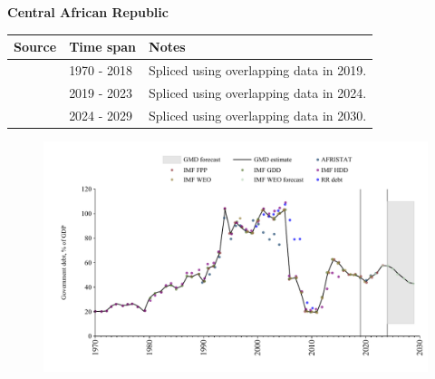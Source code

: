 \documentclass[12pt,a4paper,landscape]{article}
\begin{document}
\begin{adjustbox}{max totalsize={\paperwidth}{\paperheight},center}
\begin{minipage}[t][\textheight][t]{\textwidth}
\vspace*{0.5cm}
{}
\begin{center}
{\Large\bfseries Central African Republic}
\end{center}
\vspace{0.5cm}
\begin{table}[H]
\centering
\small
\begin{tabular}{|l|l|l|}
\hline
\textbf{Source} & \textbf{Time span} & \textbf{Notes} \\
\hline
\rowcolor{white}\cite{IMF_GDD}& 1970 - 2018 &Spliced using overlapping data in 2019.\\
\rowcolor{lightgray}\cite{IMF_FPP}& 2019 - 2023 &Spliced using overlapping data in 2024.\\
\rowcolor{white}\cite{IMF_WEO_forecast}& 2024 - 2029 &Spliced using overlapping data in 2030.\\
\hline
\end{tabular}
\end{table}
\begin{figure}[H]
\centering
\includegraphics[width=\textwidth,height=0.6\textheight,keepaspectratio]{graphs/CAF_govdebt_GDP.pdf}
\end{figure}
\end{minipage}
\end{adjustbox}
\end{document}
